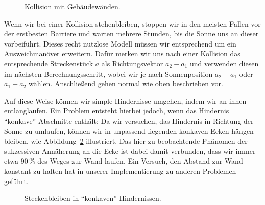 \documentclass[
    paper=a4,
    DIV14,
    fontsize=12pt,
    pagesize=pdftex,
    toc=bibliographynumbered
]{scrartcl}
\numberwithin{figure}{section}
\numberwithin{equation}{section}
\numberwithin{table}{section}
\begin{document}
\begin{figure}[htb]
    \centering
    \caption{Kollision mit Gebäudewänden.}
    \label{fig:collision}
\end{figure}

Wenn wir bei einer Kollision stehenbleiben, stoppen wir in den meisten Fällen vor der
erstbesten Barriere und warten mehrere Stunden, bis die Sonne uns an dieser vorbeiführt.
Dieses recht nutzlose Modell müssen wir entsprechend um ein Ausweichmanöver erweitern.
Dafür merken wir uns nach einer Kollision das entsprechende Streckenstück $a$ als
Richtungsvektor $a_2-a_1$ und verwenden diesen im nächsten Berechnungsschritt, wobei wir
je nach Sonnenposition $a_2-a_1$ oder $a_1-a_2$ wählen. Anschließend gehen normal wie oben
beschrieben vor.

Auf diese Weise können wir simple Hindernisse umgehen, indem wir an ihnen entlanglaufen.
Ein Problem entsteht hierbei jedoch, wenn das Hindernis \enquote{konkave} Abschnitte
enthält: Da wir versuchen, das Hindernis in Richtung der Sonne zu umlaufen, können wir in
unpassend liegenden konkaven Ecken hängen bleiben, wie Abbildung~\ref{fig:collconcave}
illustriert. Das hier zu beobachtende Phänomen der sukzessiven Annäherung an die Ecke ist
dabei damit verbunden, dass wir immer etwa 90\,\% des Weges zur Wand laufen. Ein Versuch,
den Abstand zur Wand konstant zu halten hat in unserer Implementierung zu anderen
Problemen geführt.

\begin{figure}[htb]
    \centering
    \caption{Steckenbleiben in \enquote{konkaven} Hindernissen.}
    \label{fig:collconcave}
\end{figure}
\end{document}
